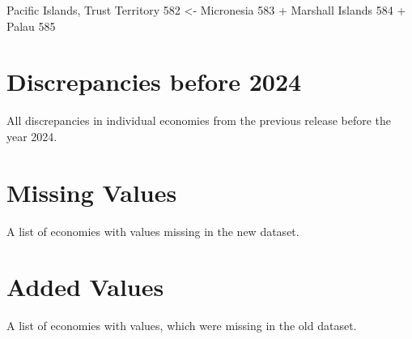 \documentclass[
]{book}
\begin{document}
Pacific Islands, Trust Territory 582 \textless- Micronesia 583 + Marshall Islands 584 + Palau 585

\chapter{Discrepancies before 2024}\label{discrepancies-before-2024}

All discrepancies in individual economies from the previous release before the year 2024.

\chapter{Missing Values}\label{missing-values}

A list of economies with values missing in the new dataset.

\chapter{Added Values}\label{added-values}

A list of economies with values, which were missing in the old dataset.

  
\end{document}
